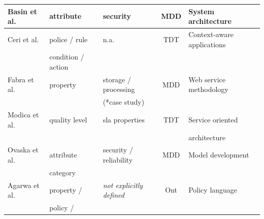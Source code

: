 \begin{table}[ht!]
\begin{tabular}{l|l|l|c|l}
  \hline
  Basin et al. \cite{BasinDL06} &  attribute & security  & MDD & System
  architecture
  \\
  \hline
  Ceri et al. \cite{CeriDMF07} & police / rule  & n.a. & TDT & Context-aware
  applications
   \\
  &  condition / action &    &  &
  
  \\
  \hline
  Fabra et al. \cite{Fabra2011} & property & storage /
  processing & MDD & Web service methodology 
  \\
   &   & (*case study) &  & 
  \\
  \hline
  Modica et al. \cite{ModicaTV09} & quality level & sla
  properties & TDT &  Service oriented 
  \\
   &  &  &  & architecture \\
  \hline
  Ovaska et al. \cite{OvaskaEHPA10} & attribute & security / reliability
  & MDD &  Model development
  \\
   
  &  category &    &  &
  \\
  \hline
  Agarwa et al. \cite{AgarwalLS09} & property / & \textit{not explicitly
  defined} & Ont & Policy language
  \\
   
  &  policy / &    &  &
  \\
  

\end{tabular}
\end{table}
